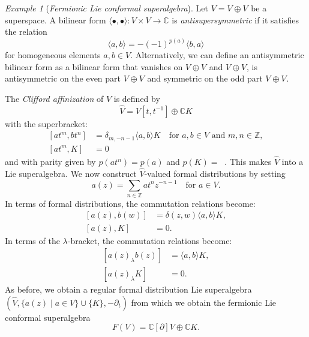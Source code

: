 \documentclass[a4paper, 12pt, reqno]{amsart}
\theoremstyle{remark}
\newtheorem{example}[theorem]{Example}
\numberwithin{equation}{subsection}
\DeclareMathOperator{\zero}{\overline{0}}
\DeclareMathOperator{\one}{\overline{1}}
\begin{document}
\begin{example}[\emph{Fermionic Lie conformal superalgebra}]
  \label{exa:3}
  Let $V = V_{\zero} \oplus V_{\one}$ be a superspace.
  A bilinear form $\langle\bullet, \bullet\rangle: V \times V \to \mathbb{C}$ is \emph{antisupersymmetric} if it satisfies the relation
  \begin{equation*}
    \langle a, b\rangle = -(-1)^{p(a)}\langle b, a\rangle
  \end{equation*}
  for homogeneous elements $a, b \in V$.
  Alternatively, we can define an antisymmetric bilinear form as a bilinear form that vanishes on $V_{\zero} \oplus V_{\one}$ and $V_{\one} \oplus V_{\zero}$, is antisymmetric on the even part $V_{\zero} \oplus V_{\zero}$ and symmetric on the odd part $V_{\one} \oplus V_{\one}$.

  The \emph{Clifford affinization} of $V$ is defined by
  \begin{equation*}
    \widehat{V} = V[t, t^{-1}] \oplus \mathbb{C}K
  \end{equation*}
  with the superbracket:
  \begin{equation*}
    \begin{split}
      [at^m, bt^n] &= \delta_{m, -n - 1}\langle a, b\rangle K \quad \text{for }a, b \in V\text{ and }m, n \in \mathbb{Z}, \\
      [at^m, K] &= 0
    \end{split}
  \end{equation*}
  and with parity given by $p(at^n) = p(a)$ and $p(K) = \zero$.
  This makes $\widehat{V}$ into a Lie superalgebra.
  We now construct $\widehat{V}$-valued formal distributions by setting
  \begin{equation*}
    a(z) = \sum_{n \in \mathbb{Z}}at^nz^{-n - 1} \quad \text{for }a \in V.
  \end{equation*}
  In terms of formal distributions, the commutation relations become:
  \begin{equation*}
    \begin{split}
      [a(z), b(w)] &= \delta(z, w)\langle a, b\rangle K, \\
      [a(z), K] &= 0.
    \end{split}
  \end{equation*}
  In terms of the $\lambda$-bracket, the commutation relations become:
  \begin{equation*}
    \begin{split}
      [a(z)_{\lambda}b(z)] &= \langle a, b\rangle K, \\
      [a(z)_{\lambda}K] &= 0.
    \end{split}
  \end{equation*}
  As before, we obtain a regular formal distribution Lie superalgebra $(\widehat{V}, \{a(z) \mid a \in V\} \cup \{K\}, -\partial_t)$ from which we obtain the fermionic Lie conformal superalgebra
  \begin{equation*}
    F(V) = \mathbb{C}[\partial]V \oplus \mathbb{C}K.
  \end{equation*}
\end{example}
\end{document}
